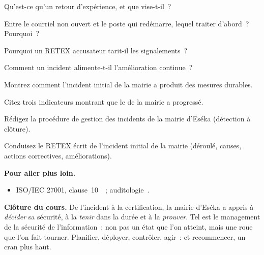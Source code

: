 \begin{boxexo}[title={\ding{45}\quad Exercice~20.3. RETEX \niveaubase}]
Qu'est-ce qu'un retour d'expérience, et que vise-t-il~?
\end{boxexo}

\begin{boxexo}[title={\ding{45}\quad Exercice~20.4. Prioriser \niveaumoyen}]
Entre le courriel non ouvert et le poste qui redémarre, lequel traiter d'abord~?
Pourquoi~?
\end{boxexo}

\begin{boxexo}[title={\ding{45}\quad Exercice~20.5. Cause ou faute \niveaumoyen}]
Pourquoi un RETEX accusateur tarit-il les signalements~?
\end{boxexo}

\begin{boxexo}[title={\ding{45}\quad Exercice~20.6. Incident et clause 10 \niveaumoyen}]
Comment un incident alimente-t-il l'amélioration continue~?
\end{boxexo}

\begin{boxexo}[title={\ding{45}\quad Exercice~20.7. L'incident fondateur \niveaumoyen}]
Montrez comment l'incident initial de la mairie a produit des mesures durables.
\end{boxexo}

\begin{boxexo}[title={\ding{45}\quad Exercice~20.8. Mesurer le progrès \niveaumoyen}]
Citez trois indicateurs montrant que le  de la mairie a progressé.
\end{boxexo}

\begin{boxexo}[title={\ding{45}\quad Exercice~20.9. Procédure d'incident \niveauexpert}]
Rédigez la procédure de gestion des incidents de la mairie d'Eséka (détection à
clôture).
\end{boxexo}

\begin{boxexo}[title={\ding{45}\quad Exercice~20.10. RETEX complet \niveauexpert}]
Conduisez le RETEX écrit de l'incident initial de la mairie (déroulé, causes,
actions correctives, améliorations).
\end{boxexo}

\bigskip

\begin{boxinfo}
\textbf{Pour aller plus loin.}
\begin{itemize}
    \item ISO/IEC 27001, clause~10~\cite{iso27001}~; auditologie~\cite{minka2026auditologie}.
\end{itemize}
\end{boxinfo}

\begin{boxinfo}
\textbf{Clôture du cours.} De l'incident à la certification, la mairie d'Eséka
a appris à \emph{décider} sa sécurité, à la \emph{tenir} dans la durée et à la
\emph{prouver}. Tel est le management de la sécurité de l'information~: non pas
un état que l'on atteint, mais une roue que l'on fait tourner. Planifier,
déployer, contrôler, agir~: et recommencer, un cran plus haut.
\end{boxinfo}
